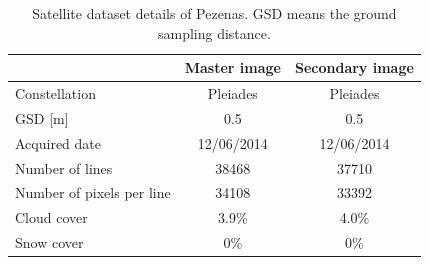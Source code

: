 \begin{table}[htbp]
	\scriptsize %
	\centering
	\begin{tabular}{||l|c|c||}\hline
		& Master image & Secondary image\\\hline
		Constellation & Pleiades & Pleiades \\
		GSD [m] & 0.5 & 0.5\\
		Acquired date & 12/06/2014 & 12/06/2014 \\
		Number of lines & 38468 & 37710 \\
		Number of pixels per line & 34108 & 33392 \\
		Cloud cover & 3.9\% & 4.0\% \\
		Snow cover & 0\% & 0\% \\\hline
	\end{tabular}
	\caption{Satellite dataset details of Pezenas. GSD means the ground sampling distance.}
	\label{SatelliteData}
\end{table}

